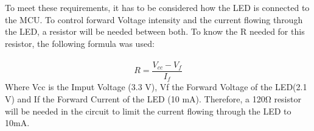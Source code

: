 To meet these requirements, it has to be considered how the LED is connected to the MCU. To control forward Voltage intensity and the current flowing through the LED, a resistor will be needed between both. To know the R needed for this resistor, the following formula was used:\\\\
\begin{equation}
R = \frac{V_{cc} - V_{f}}{I_{f}}
\end{equation}
Where Vcc is the Imput Voltage (3.3 V), Vf the Forward Voltage of the LED(2.1 V) and If the Forward Current of the LED (10 mA). Therefore, a 120\si{\ohm} resistor will be needed in the circuit to limit the current flowing through the LED to 10mA.  \\\\
